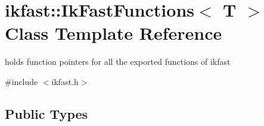 \hypertarget{classikfast_1_1IkFastFunctions}{\section{ikfast\-:\-:Ik\-Fast\-Functions$<$ T $>$ Class Template Reference}
\label{classikfast_1_1IkFastFunctions}
}


holds function pointers for all the exported functions of ikfast  




{\ttfamily \#include $<$ikfast.\-h$>$}

\subsection*{Public Types}
